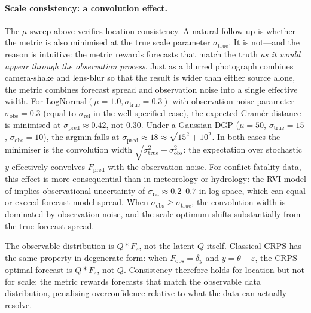 \paragraph{Scale consistency: a convolution effect.}
The $\mu$-sweep above verifies location-consistency. A natural follow-up is whether the metric is also minimised at the true scale parameter $\sigma_\text{true}$. It is not---and the reason is intuitive: the metric rewards forecasts that match the truth \emph{as it would appear through the observation process}. Just as a blurred photograph combines camera-shake and lens-blur so that the result is wider than either source alone, the metric combines forecast spread and observation noise into a single effective width. For $\text{LogNormal}(\mu = 1.0, \sigma_\text{true} = 0.3)$ with observation-noise parameter $\sigma_\text{obs} = 0.3$ (equal to $\sigma_\text{rel}$ in the well-specified case), the expected Cram\'er distance is minimised at $\sigma_\text{pred} \approx 0.42$, not $0.30$. Under a Gaussian DGP ($\mu = 50$, $\sigma_\text{true} = 15$, $\sigma_\text{obs} = 10$), the argmin falls at $\sigma_\text{pred} \approx 18 \approx \sqrt{15^2 + 10^2}$. In both cases the minimiser is the convolution width $\sqrt{\sigma_\text{true}^2 + \sigma_\text{obs}^2}$: the expectation over stochastic $y$ effectively convolves $F_\text{pred}$ with the observation noise. For conflict fatality data, this effect is more consequential than in meteorology or hydrology: the RVI model of \citet{vesco2026uncertainty} implies observational uncertainty of $\sigma_\text{rel} \approx 0.2$--$0.7$ in log-space, which can equal or exceed forecast-model spread. When $\sigma_\text{obs} \geq \sigma_\text{true}$, the convolution width is dominated by observation noise, and the scale optimum shifts substantially from the true forecast spread.

The observable distribution is $Q * F_\varepsilon$, not the latent $Q$ itself. Classical CRPS has the same property in degenerate form: when $F_\text{obs} = \delta_y$ and $y = \theta + \varepsilon$, the CRPS-optimal forecast is $Q * F_\varepsilon$, not $Q$. Consistency therefore holds for location but not for scale: the metric rewards forecasts that match the observable data distribution, penalising overconfidence relative to what the data can actually resolve.
